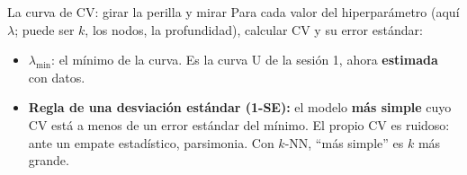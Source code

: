 \documentclass{beamer}
\newcommand{\1}{\mathbb{I}}
\begin{document}
\begin{frame}{La curva de CV: girar la perilla y mirar}
\small
Para cada valor del hiperparámetro (aquí $\lambda$; puede ser $k$, los nodos, la profundidad), calcular $\mathrm{CV}$ y su error estándar:
\begin{center}
\end{center}
\pause
\begin{itemize}\itemsep3pt
  \item $\lambda_{\min}$: el mínimo de la curva. Es la curva U de la sesión 1, ahora \textbf{estimada} con datos.
  \item \textbf{Regla de una desviación estándar (1-SE):} el modelo \textbf{más simple} cuyo CV está a menos de un error estándar del mínimo. El propio CV es ruidoso: ante un empate estadístico, parsimonia. Con $k$-NN, ``más simple'' es $k$ más grande.
\end{itemize}
\end{frame}
\end{document}

